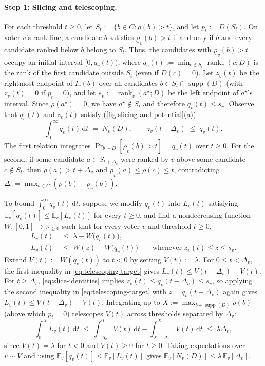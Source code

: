 \documentclass[11pt]{article}
\numberwithin{equation}{section}
\theoremstyle{plain}
\theoremstyle{definition}
\newcommand{\E}{\mathbb{E}}
\newcommand{\R}{\mathbb{R}}
\newcommand{\1}{\mathbf{1}}
\newcommand{\lowrho}{\underline{\rho}}
\newcommand{\rank}{\operatorname{rank}}
\newcommand{\supp}{\operatorname{supp}}
\begin{document}
\paragraph{Step 1: Slicing and telescoping.}
For each threshold $t \ge 0$, let $S_t := \{b \in C : \rho(b) > t\}$, and let $p_t := D(S_t)$. On voter $v$'s rank line, a candidate $b$ satisfies $\lowrho_v(b) > t$ if and only if $b$ and every candidate ranked below $b$ belong to $S_t$. Thus, the candidates with $\lowrho_v(b) > t$ occupy an initial interval $[0, q_v(t))$, where $q_v(t) := \min_{c \notin S_t} \rank_v(c; D)$ is the rank of the first candidate outside $S_t$ (even if $D(c) = 0$). Let $z_v(t)$ be the rightmost endpoint of $I_v(b)$ over all candidates $b \in S_t \cap \supp(D)$ (with $z_v(t) = 0$ if $p_t = 0$), and let $s_v := \rank_v(a^\star; D)$ be the left endpoint of $a^\star$'s interval. Since $\rho(a^\star) = 0$, we have $a^\star \notin S_t$ and therefore $q_v(t) \le s_v$. Observe that $q_v(t)$ and $z_v(t)$ satisfy (\cref{fig:slicing-and-potential}(a))
\begin{equation}
  \int_0^\infty q_v(t)\,\mathrm{d}t \;=\; N_v(D),
  \qquad
  z_v(t + \Delta_v) \;\le\; q_v(t).
  \label{eq:slice-identities}
\end{equation}
The first relation integrates $\Pr_{b \sim D}[\lowrho_v(b) > t] = q_v(t)$ over $t \ge 0$. For the second, if some candidate $a \in S_{t + \Delta_v}$ were ranked by $v$ above some candidate $c \notin S_t$, then $\rho(a) > t + \Delta_v$ and $\lowrho_v(a) \le \rho(c) \le t$, contradicting $\Delta_v = \max_{b \in C}(\rho(b) - \lowrho_v(b))$.

To bound $\int_0^\infty q_v(t)\,\mathrm{d}t$, suppose we modify $q_v(t)$ into $L_v(t)$ satisfying $\E_v[q_v(t)] \le \E_v[L_v(t)]$ for every $t \ge 0$, and find a nondecreasing function $W \colon [0, 1] \to \R_{\ge 0}$ such that for every voter $v$ and threshold $t \ge 0$,
\begin{equation}
  \begin{aligned}
    L_v(t) &\;\le\; \lambda - W\bigl(q_v(t)\bigr), \\
    L_v(t) &\;\le\; W(z) - W\bigl(q_v(t)\bigr) \qquad \text{whenever } z_v(t) \le z \le s_v.
  \end{aligned}
  \label{eq:telescoping-target}
\end{equation}
Extend $V(t) := W(q_v(t))$ to $t < 0$ by setting $V(t) := \lambda$. For $0 \le t < \Delta_v$, the first inequality in \cref{eq:telescoping-target} gives $L_v(t) \le V(t - \Delta_v) - V(t)$. For $t \ge \Delta_v$, \cref{eq:slice-identities} implies $z_v(t) \le q_v(t - \Delta_v) \le s_v$, so applying the second inequality in \cref{eq:telescoping-target} with $z = q_v(t - \Delta_v)$ again gives $L_v(t) \le V(t - \Delta_v) - V(t)$. Integrating up to $X := \max_{b \in \supp(D)} \rho(b)$ (above which $p_t = 0$) telescopes $V(t)$ across thresholds separated by $\Delta_v$:
\[
  \int_0^X L_v(t)\,\mathrm{d}t
  \;\le\; \int_{-\Delta_v}^0 V(t)\,\mathrm{d}t - \int_{X - \Delta_v}^X V(t)\,\mathrm{d}t
  \;\le\; \lambda\Delta_v,
\]
since $V(t) = \lambda$ for $t < 0$ and $V(t) \ge 0$ for $t \ge 0$. Taking expectations over $v \sim V$ and using $\E_v[q_v(t)] \le \E_v[L_v(t)]$ gives $\E_v[N_v(D)] \le \lambda\,\E_v[\Delta_v]$.
\end{document}
